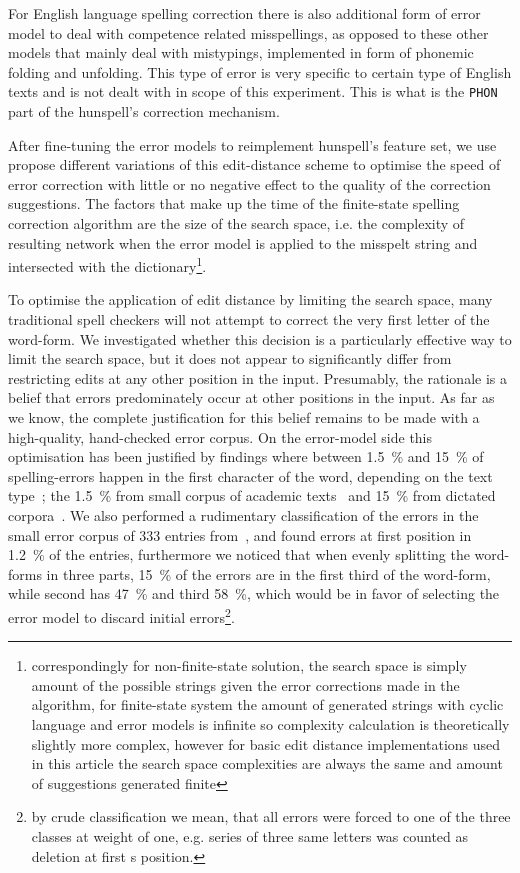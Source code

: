 \documentclass[11pt]{article}
\begin{document}
For English language spelling correction there is also additional form of
error model to deal with competence related misspellings, as opposed to these
other models that mainly deal with mistypings, implemented in form of phonemic
folding and unfolding. This type of error is very specific to certain type of
English texts and is not dealt with in scope of this experiment. This is what is
the \texttt{PHON} part of the hunspell's correction mechanism.

After fine-tuning the error models to reimplement hunspell's feature set, we
use propose different variations of this edit-distance scheme to optimise the
speed of error correction with little or no negative effect to the quality of
the correction suggestions. The factors that make up the time of the
finite-state spelling correction algorithm are the size of the search space,
i.e. the complexity of resulting network when the error model is applied to the
misspelt string and intersected with the dictionary\footnote{correspondingly
for non-finite-state solution, the search space is simply amount of the
possible strings given the error corrections made in the algorithm, for
finite-state system the amount of generated strings with cyclic language and
error models is infinite so complexity calculation is theoretically slightly
more complex, however for basic edit distance implementations used in this
article the search space complexities are always the same and amount of
suggestions generated finite}.

To optimise the application of edit distance by limiting the search space, many
traditional spell checkers will not attempt to correct the very first letter of
the word-form. We investigated whether this decision is a particularly
effective way to limit the search space, but it does not appear to
significantly differ from restricting edits at any other position in the input.
Presumably, the rationale is a belief that errors predominately occur at other
positions in the input. As far as we know, the complete justification for this
belief remains to be made with a high-quality, hand-checked error corpus.
On the error-model side this optimisation has been justified by findings where
between 1.5~\% and 15~\% of spelling-errors happen in the first character of
the word, depending on the text type~\cite{Bhagat/2007};
the 1.5~\% from small corpus of academic texts~\cite{Yannakoudakis/1983}
and 15~\% from dictated corpora~\cite{Kukich/1992}. We also performed a
rudimentary classification of the errors in the small error corpus of
333 entries from~, and found errors at
first position in 1.2~\% of the entries, furthermore we noticed that
when evenly splitting the word-forms in three parts, 15~\% of the errors are
in the first third of the word-form, while second has 47~\% and third 58~\%,
which would be in favor of selecting the error model to discard initial
errors\footnote{by crude classification we mean, that all errors were
forced to one of the three classes at weight of one, e.g. series of
three same letters was counted as deletion at first s position.}.
\end{document}
